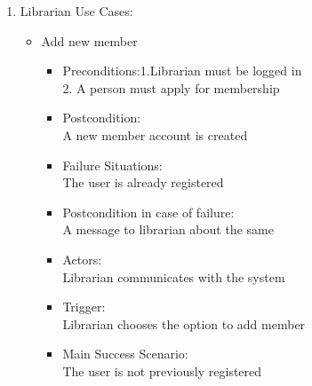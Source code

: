 \documentclass{article}
\begin{document}
\begin{enumerate}
\begin{itemize}
\begin{itemize}
\end{itemize}	 
 
 \end{itemize}
 


\item Librarian Use Cases:
\begin{itemize}
 \item Add new member
 \begin{itemize}
  \item Preconditions:1.Librarian must be logged in\\2. A person must apply for membership
 \\ \item Postcondition:\\A new member account is created \\
 \item Failure Situations:\\ The user is already registered\\
 \item Postcondition in case of failure:\\A message to librarian about the same\\
\item  Actors:\\ Librarian communicates with the system\\
 \item Trigger: \\Librarian  chooses the option to add member\\
 \item Main Success Scenario:\\ The user is not previously registered\\
 \end{itemize}


\end{itemize}
\end{enumerate}
\end{document}
